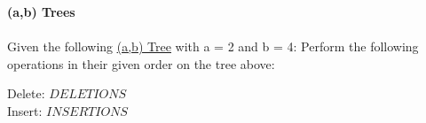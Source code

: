 \textbf{\LARGE{\color{tumgadRed}(a,b) Trees}}\\
\\
\noindent
Given the following \href{https://sebastianoner.github.io/TUMGAD/src/DataStructures/SearchStructures/ABTrees/ABLTrees}{\underline{(a,b) Tree}} with a = 2 and b = 4:
\noindent
Perform the following operations in their given order on the tree above:
\begin{center}
    Delete: $DELETIONS$\\
    Insert: $INSERTIONS$\\
\end{center}
